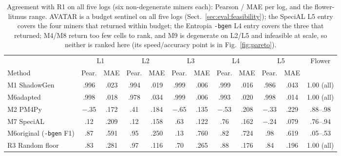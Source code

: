 \documentclass[runningheads]{llncs}
\newcommand{\chg}[1]{#1}
\begin{document}
\begin{table}[t]
\centering
\caption{Agreement with R1 on all five logs (six non-degenerate miners each): Pearson / MAE per log, and the flower-litmus range. \chg{AVATAR is a budget sentinel on all five logs (Sect.~\ref{sec:eval:feasibility});} the SpeciAL L5 entry covers the four miners that returned within budget; \chg{the Entropia \texttt{-bgen} L4 entry covers the three that returned;} M4/M8 return too few cells to rank, and M9 is degenerate on L2/L5 and infeasible at scale, so neither is ranked here (its speed/accuracy point is in Fig.~\ref{fig:pareto}).}
\label{tab:scale}
\setlength{\tabcolsep}{2.2pt}
\scriptsize
\begin{tabular}{@{}l cc cc cc cc cc c@{}}
\toprule
 & \multicolumn{2}{c}{L1} & \multicolumn{2}{c}{L2} & \multicolumn{2}{c}{L3} & \multicolumn{2}{c}{L4} & \multicolumn{2}{c}{L5} & Flower \\
\cmidrule(lr){2-3}\cmidrule(lr){4-5}\cmidrule(lr){6-7}\cmidrule(lr){8-9}\cmidrule(lr){10-11}
Method & Pear. & MAE & Pear. & MAE & Pear. & MAE & Pear. & MAE & Pear. & MAE & \\
\midrule
M1 ShadowGen & .996 & .023 & .994 & .019 & .999 & .006 & .999 & .016 & .986 & .043 & 1.00 (all) \\
M6adapted & .998 & .018 & .978 & .034 & .999 & .006 & .993 & .020 & .998 & .014 & 1.00 (all) \\
M2 PM4Py & $-$.35 & .172 & .41 & .184 & $-$.65 & .135 & $-$.53 & .208 & $-$.33 & .229 & .88--.98 \\
M7 SpeciAL & .12 & .209 & .12 & .158 & .63 & .122 & .76 & .162 & $-$.24 & .079 & .76--.94 \\
M6original (\texttt{-bgen} F1) & .87 & .591 & .95 & .250 & .13 & .760 & .82 & .724 & .98 & .619 & .05--.53 \\
R3 Random floor & .83 & .281 & .97 & .116 & .70 & .265 & .88 & .176 & .84 & .196 & 1.00 (all) \\
\bottomrule
\end{tabular}
\end{table}
\end{document}
